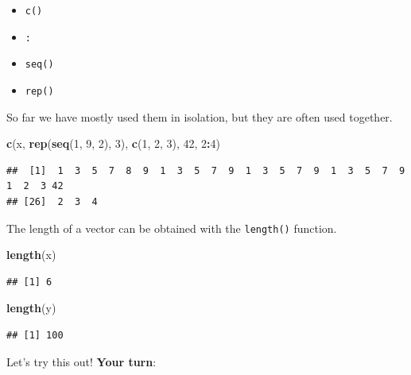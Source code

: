 \documentclass[]{book}
\newenvironment{Shaded}{\begin{snugshade}}{\end{snugshade}}
\newcommand{\KeywordTok}[1]{\textcolor[rgb]{0.13,0.29,0.53}{\textbf{#1}}}
\newcommand{\DecValTok}[1]{\textcolor[rgb]{0.00,0.00,0.81}{#1}}
\newcommand{\OperatorTok}[1]{\textcolor[rgb]{0.81,0.36,0.00}{\textbf{#1}}}
\newcommand{\NormalTok}[1]{#1}
\providecommand{\tightlist}{%
  \setlength{\itemsep}{0pt}\setlength{\parskip}{0pt}}
\newenvironment{warning}{\begin{tcolorbox}[colback=orange!5!white,colframe=orange]}{\end{tcolorbox}}
\begin{document}
\begin{itemize}
\tightlist
\item
  \texttt{c()}
\item
  \texttt{:}
\item
  \texttt{seq()}
\item
  \texttt{rep()}
\end{itemize}

So far we have mostly used them in isolation, but they are often used
together.

\begin{Shaded}
\begin{Highlighting}[]
\KeywordTok{c}\NormalTok{(x, }\KeywordTok{rep}\NormalTok{(}\KeywordTok{seq}\NormalTok{(}\DecValTok{1}\NormalTok{, }\DecValTok{9}\NormalTok{, }\DecValTok{2}\NormalTok{), }\DecValTok{3}\NormalTok{), }\KeywordTok{c}\NormalTok{(}\DecValTok{1}\NormalTok{, }\DecValTok{2}\NormalTok{, }\DecValTok{3}\NormalTok{), }\DecValTok{42}\NormalTok{, }\DecValTok{2}\OperatorTok{:}\DecValTok{4}\NormalTok{)}
\end{Highlighting}
\end{Shaded}

\begin{verbatim}
##  [1]  1  3  5  7  8  9  1  3  5  7  9  1  3  5  7  9  1  3  5  7  9  1  2  3 42
## [26]  2  3  4
\end{verbatim}

The length of a vector can be obtained with the \texttt{length()}
function.

\begin{Shaded}
\begin{Highlighting}[]
\KeywordTok{length}\NormalTok{(x)}
\end{Highlighting}
\end{Shaded}

\begin{verbatim}
## [1] 6
\end{verbatim}

\begin{Shaded}
\begin{Highlighting}[]
\KeywordTok{length}\NormalTok{(y)}
\end{Highlighting}
\end{Shaded}

\begin{verbatim}
## [1] 100
\end{verbatim}

\begin{warning}
Let's try this out! \textbf{Your turn}:
\end{warning}
\end{document}
